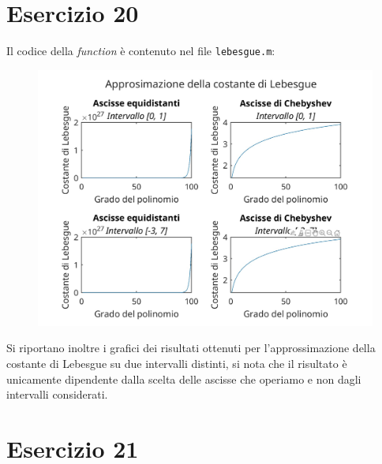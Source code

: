 \documentclass[10pt,a4paper]{article}
\begin{document}
\section*{Esercizio 20}
Il codice della \textit{function} è contenuto nel file \texttt{lebesgue.m}:\\

\begin{figure}[h]
  \centering
  \includegraphics[width=1.1\textwidth]{../figure/plot20}  
\end{figure}
Si riportano inoltre i grafici dei risultati ottenuti per l'approssimazione della costante di Lebesgue su due intervalli distinti, si nota che il risultato è unicamente dipendente dalla scelta delle ascisse che operiamo e non dagli intervalli considerati.
\clearpage

\section*{Esercizio 21}
\end{document}
